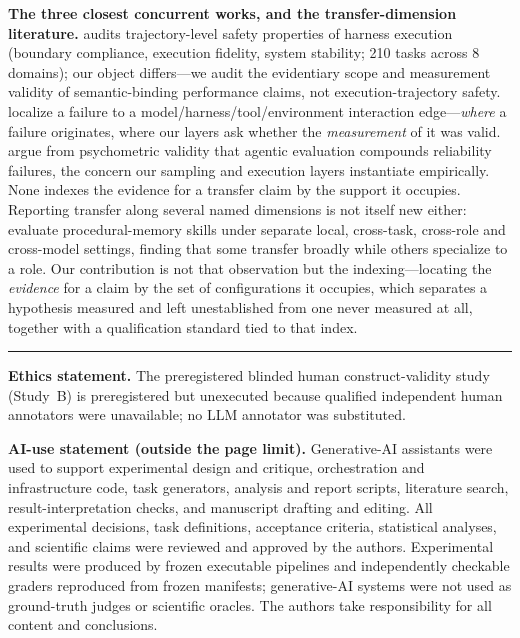 \documentclass{article}
\begin{document}
\vspace{6pt}
\noindent\textbf{The three closest concurrent works, and the transfer-dimension literature.} \citet{harnessaudit} audits trajectory-level safety properties of harness execution (boundary compliance, execution fidelity, system stability; 210 tasks across 8 domains); our object differs---we audit the evidentiary scope and measurement validity of semantic-binding performance claims, not execution-trajectory safety. \citet{modelharness} localize a failure to a model/harness/tool/environment interaction edge---\emph{where} a failure originates, where our layers ask whether the \emph{measurement} of it was valid. \citet{measvalidity} argue from psychometric validity that agentic evaluation compounds reliability failures, the concern our sampling and execution layers instantiate empirically. None indexes the evidence for a transfer claim by the support it occupies. Reporting transfer along several named dimensions is not itself new either: \citet{after} evaluate procedural-memory skills under separate local, cross-task, cross-role and cross-model settings, finding that some transfer broadly while others specialize to a role. Our contribution is not that observation but the indexing---locating the \emph{evidence} for a claim by the set of configurations it occupies, which separates a hypothesis measured and left unestablished from one never measured at all, together with a qualification standard tied to that index.

\vspace{6pt}\hrule\vspace{4pt}
\noindent\textbf{Ethics statement.} The preregistered blinded human construct-validity study (Study~B) is preregistered but unexecuted because qualified independent human annotators were unavailable; no LLM annotator was substituted.

\noindent\textbf{AI-use statement (outside the page limit).} Generative-AI assistants were used to support experimental design and critique, orchestration and infrastructure code, task generators, analysis and report scripts, literature search, result-interpretation checks, and manuscript drafting and editing. All experimental decisions, task definitions, acceptance criteria, statistical analyses, and scientific claims were reviewed and approved by the authors. Experimental results were produced by frozen executable pipelines and independently checkable graders reproduced from frozen manifests; generative-AI systems were not used as ground-truth judges or scientific oracles. The authors take responsibility for all content and conclusions.
\end{document}
